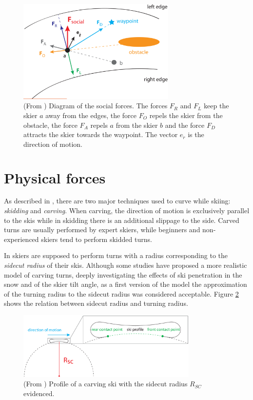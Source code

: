 \documentclass[12pt,a4paper,twoside]{book}
\begin{document}
\begin{figure}
  \begin{center}
    \includegraphics[width=0.7\textwidth]{images/social_forces_dia.eps}
    \caption{(From \cite{hol2012}) Diagram of the social forces. The forces $F_R$ and $F_L$ keep the skier $a$ away from the edges, the force $F_O$ repels the skier from the obstacle, the force $F_A$ repels $a$ from the skier $b$ and the force $F_D$ attracts the skier towards the waypoint. The vector $e_{\dot{r}}$ is the direction of motion.}\label{social_forces_diagram}
  \end{center}
\end{figure}


\section{Physical forces}
As described in \cite{hol2012}, there are two major techniques used to curve while skiing: \textit{skidding} and \textit{carving}. When carving, the direction of motion is exclusively parallel to the skis while in skidding there is an additional slippage to the side. Carved turns are usually performed by expert skiers, while beginners and non-experienced skiers tend to perform skidded turns.

In \cite{hol2012} skiers are supposed to perform turns with a radius corresponding to the \textit{sidecut radius} of their skis. Although some studies \cite{jen2004} \cite{fe2010} have proposed a more realistic model of carving turns, deeply investigating the effects of ski penetration in the snow and of the skier tilt angle, as a first version of the model the approximation of the turning radius to the sidecut radius was considered acceptable. Figure \ref{sidecut_radius} shows the relation between sidecut radius and turning radius.

\begin{figure}
  \begin{center}
    \includegraphics[width=0.8\textwidth]{images/sidecut_radius.eps}
    \caption{(From \cite{hol2012}) Profile of a carving ski with the sidecut radius $R_{SC}$ evidenced.}\label{sidecut_radius}
  \end{center}
\end{figure}
\end{document}
